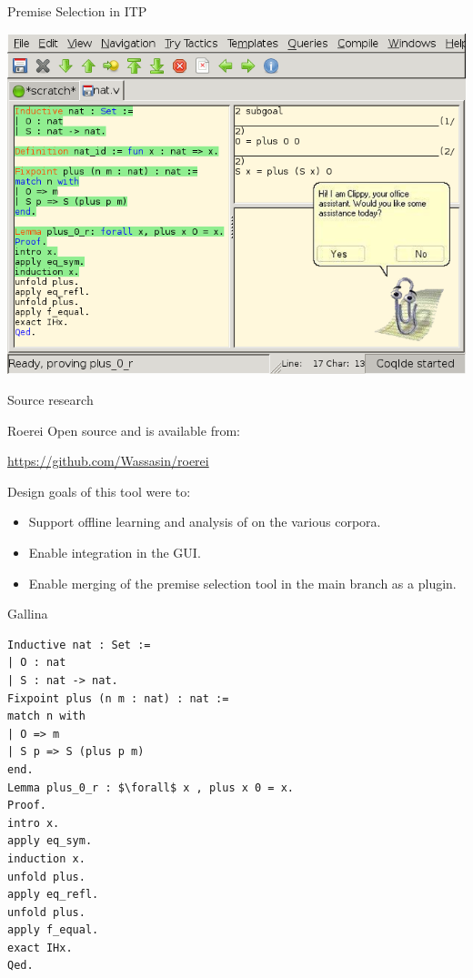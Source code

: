 \documentclass[department=ds, notes={hide notes}, slidesperpage=1]{beamerruhuisstijl}
\begin{document}
\begin{frame}{Premise Selection in ITP}
	\begin{center}
		\includegraphics[height=0.78\textheight]{figures/coqide-clippy.png}
	\end{center}
\end{frame}

\begin{frame}{Source research}
	\begin{center}
	\end{center}
\end{frame}

\begin{frame}{Roerei}
	Open source and is available from:
	\begin{center}
		\url{https://github.com/Wassasin/roerei}
	\end{center}
	\bigskip
	Design goals of this tool were to:
	\begin{itemize}
		\item Support offline learning and analysis of \machinelearning on the various corpora.
		\item Enable integration in the \coqide GUI.
		\item Enable merging of the premise selection tool in the \coq main branch as a plugin.
	\end{itemize}
\end{frame}

\begin{frame}[fragile]{Gallina}
\begin{lstlisting}[language=Coq, mathescape,basicstyle=\footnotesize,frame=none]
Inductive nat : Set :=
| O : nat
| S : nat -> nat.
Fixpoint plus (n m : nat) : nat :=
match n with
| O => m
| S p => S (plus p m)
end.
Lemma plus_0_r : $\forall$ x , plus x 0 = x.
Proof.
intro x.
apply eq_sym.
induction x.
unfold plus.
apply eq_refl.
unfold plus.
apply f_equal.
exact IHx.
Qed.
\end{lstlisting}
\end{frame}
\end{document}
